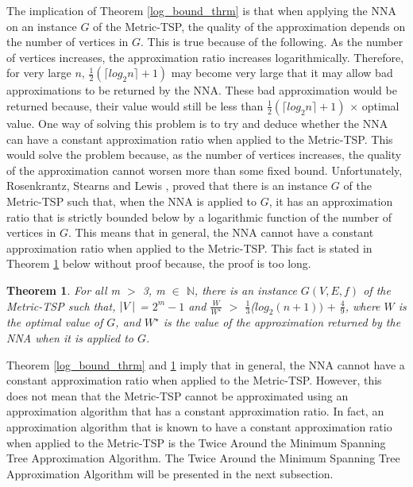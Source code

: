 \documentclass[12pt]{article}
\newtheorem{theorem}[definition]{Theorem}
\numberwithin{equation}{subsection}
\numberwithin{table}{subsection}
\numberwithin{algorithm}{subsection}
\begin{document}
The implication of Theorem \ref{log_bound_thrm} is that when applying the NNA on an instance $G$ of the Metric-TSP, the quality of the approximation depends on the number of vertices in $G$. This is true because of the following. As the number of vertices increases, the approximation ratio increases logarithmically. Therefore, for very large $n$, $\frac{1}{2}(\lceil log_2 n \rceil + 1)$ may become very large that it may allow bad approximations to be returned by the NNA. These bad approximation would be returned because, their value would still be less than $\frac{1}{2}(\lceil log_2 n \rceil + 1)$ $\times$ optimal value. One way of solving this problem is to try and deduce whether the NNA can have a constant approximation ratio when applied to the Metric-TSP. This would solve the problem because, as the number of vertices increases, the quality of the approximation cannot worsen more than some fixed bound. Unfortunately, Rosenkrantz, Stearns and Lewis \cite{Rosenkrantz}, proved that there is an instance $G$ of the Metric-TSP such that, when the NNA is applied to $G$, it has an approximation ratio that is strictly bounded below by a logarithmic function of the number of vertices in $G$. This means that in general, the NNA cannot have a constant approximation ratio when applied to the Metric-TSP. This fact is stated in Theorem \ref{no_proof} below without proof because, the proof is too long.
\begin{theorem}
\label{no_proof}
For all m $>$ 3, m $\in$ $\mathbb{N}$, there is an instance $G(V,E,f)$ of the Metric-TSP such that, $\abs{V}$ = $2^m - 1$ and $\frac{W}{W^\star}$ $>$ $\frac{1}{3}$($log_2 (n+1))$ $+$ $\frac{4}{9}$, where $W$ is the optimal value of $G$, and $W^\star$ is the value of the approximation returned by the NNA when it is applied to $G$.{}
\end{theorem}
Theorem \ref{log_bound_thrm} and \ref{no_proof} imply that in general, the NNA cannot have a constant approximation ratio when applied to the Metric-TSP. However, this does not mean that the Metric-TSP cannot be approximated using an approximation algorithm that has a constant approximation ratio. In fact, an approximation algorithm that is known to have a constant approximation ratio when applied to the Metric-TSP is the Twice Around the Minimum Spanning Tree Approximation Algorithm. The Twice Around the Minimum Spanning Tree Approximation Algorithm will be presented in the next subsection.    
\end{document}
